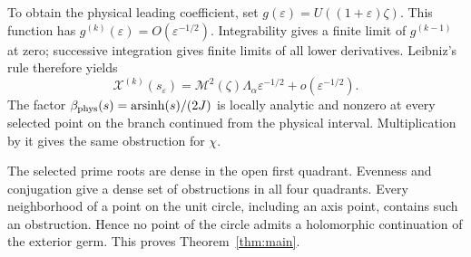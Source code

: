 \documentclass[11pt]{article}
\numberwithin{equation}{section}
\theoremstyle{remark}\newtheorem{remark}[theorem]{Remark}
\newcommand{\X}{\mathcal X}
\newcommand{\Mtwo}{\mathcal M^2}
\begin{document}
To obtain the physical leading coefficient, set
$g(\varepsilon)=U((1+\varepsilon)\zeta)$. This function
has $g^{(k)}(\varepsilon)=O(\varepsilon^{-1/2})$.
Integrability gives a finite limit of $g^{(k-1)}$ at zero;
successive integration gives finite limits of all lower derivatives.
Leibniz's rule therefore yields
\[
 \X^{(k)}(s_\varepsilon)
     =\Mtwo(\zeta)\Lambda_\alpha\varepsilon^{-1/2}
                             +o(\varepsilon^{-1/2}).
\]
The factor $\beta_{\rm phys}(s)=\operatorname{arsinh}(s)/(2J)$
is locally analytic and nonzero at every selected point on the
branch continued from the physical interval. Multiplication by it
gives the same obstruction for $\chi$.

The selected prime roots are dense in the open first quadrant.
Evenness and conjugation give a dense set of obstructions in all
four quadrants. Every neighborhood of a point on the unit circle,
including an axis point, contains such an obstruction. Hence no
point of the circle admits a holomorphic continuation of the
exterior germ. This proves Theorem~\ref{thm:main}.
\end{document}
